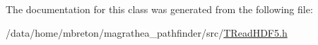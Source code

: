 The documentation for this class was generated from the following file\-:\begin{DoxyCompactItemize}
\item 
/data/home/mbreton/magrathea\-\_\-pathfinder/src/\hyperlink{TReadHDF5_8h}{T\-Read\-H\-D\-F5.\-h}\end{DoxyCompactItemize}
